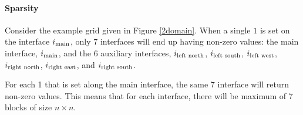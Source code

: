 \documentclass[12pt]{article}
\begin{document}
\paragraph{Sparsity}

Consider the example grid given in Figure \ref{2domain}.
When a single $1$ is set on the interface $i_{\textnormal{main}}$, only 7 interfaces will end up
having non-zero values: the main interface, $i_{\textnormal{main}}$, and the 6 auxiliary
interfaces, 
$i_{\textnormal{left north}}$, $i_{\textnormal{left south}}$, $i_{\textnormal{left west}}$,
$i_{\textnormal{right north}}$, $i_{\textnormal{right east}}$, and $i_{\textnormal{right south}}$.

For each 1 that is set along the main interface, the same 7 interface will return non-zero values.
This means that for each interface, there will be maximum of 7 blocks of size $n \times n$.
\end{document}

